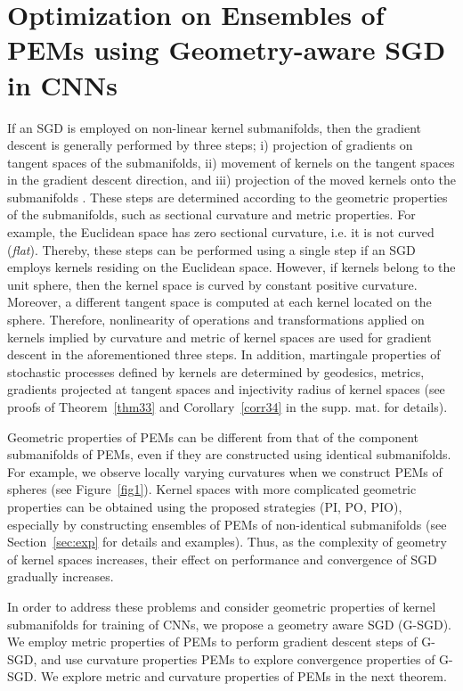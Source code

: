 \documentclass[10pt,journal,compsoc]{IEEEtran}
\theoremstyle{definition}
\theoremstyle{definition}
\theoremstyle{remark}
\theoremstyle{remark}
\theoremstyle{remark}
\begin{document}
\section{Optimization on Ensembles of PEMs using Geometry-aware SGD in CNNs}
\label{sec3}
If an SGD is employed on non-linear kernel submanifolds, then the gradient descent is generally performed by three steps;  i) projection of gradients on tangent spaces of the submanifolds, ii) movement of kernels on the tangent spaces in the gradient descent direction, and iii)  projection of the moved kernels onto the submanifolds \cite{oo16}. These steps are determined according to the geometric properties of the submanifolds, such as sectional curvature and metric properties. For example, the Euclidean space has zero sectional curvature, i.e. it is not curved (\textit{flat}). Thereby, these steps can be performed using a single step if an SGD employs kernels residing on the Euclidean space. However, if kernels belong to the unit sphere, then the kernel space is curved by constant positive curvature. Moreover, a different tangent space is computed at each kernel located on the sphere. Therefore, nonlinearity of operations and transformations applied on kernels implied by curvature and metric of kernel spaces are used for gradient descent in the aforementioned three steps. In addition, martingale properties of stochastic processes defined by kernels are determined by geodesics, metrics, gradients projected at tangent spaces and injectivity radius of kernel spaces (see proofs of Theorem~\ref{thm33} and Corollary~\ref{corr34} in the supp. mat. for details). 

Geometric properties of PEMs can be different from that of the component submanifolds of PEMs, even if they are constructed using identical submanifolds. For example, we observe locally varying curvatures when we construct PEMs of spheres (see Figure~\ref{fig1}). Kernel spaces with more complicated geometric properties can be obtained using the proposed strategies (PI, PO, PIO), especially by constructing ensembles of PEMs of non-identical submanifolds (see Section~\ref{sec:exp} for details and examples). Thus, as the complexity of geometry of kernel spaces increases, their effect on performance and convergence of SGD gradually increases. 

In order to address these problems and consider geometric properties of kernel submanifolds for training of CNNs, we propose a geometry aware SGD (G-SGD). We employ metric properties of PEMs to perform gradient descent steps of G-SGD, and use curvature properties PEMs to explore convergence properties of G-SGD. We  explore metric and curvature properties of PEMs in the next theorem. 
\end{document}
